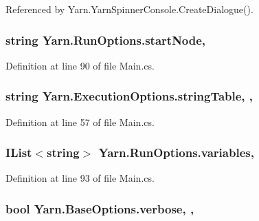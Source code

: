 Referenced by Yarn.\-Yarn\-Spinner\-Console.\-Create\-Dialogue().

\hypertarget{a00159_a785bd0f1c8b6674e7a1cfbe38c29b961}{
\subsubsection[{start\-Node}]{\setlength{\rightskip}{0pt plus 5cm}string Yarn.\-Run\-Options.\-start\-Node\hspace{0.3cm}{\ttfamily [get]}, {\ttfamily [set]}}}\label{a00159_a785bd0f1c8b6674e7a1cfbe38c29b961}


Definition at line 90 of file Main.\-cs.

\hypertarget{a00105_a7e43c3b73722956cb0f5d507e4eef527}{
\subsubsection[{string\-Table}]{\setlength{\rightskip}{0pt plus 5cm}string Yarn.\-Execution\-Options.\-string\-Table\hspace{0.3cm}{\ttfamily [get]}, {\ttfamily [set]}, {\ttfamily [inherited]}}}\label{a00105_a7e43c3b73722956cb0f5d507e4eef527}


Definition at line 57 of file Main.\-cs.

\hypertarget{a00159_a2222c73ce5366b02490c6123b711f596}{
\subsubsection[{variables}]{\setlength{\rightskip}{0pt plus 5cm}I\-List$<$string$>$ Yarn.\-Run\-Options.\-variables\hspace{0.3cm}{\ttfamily [get]}, {\ttfamily [set]}}}\label{a00159_a2222c73ce5366b02490c6123b711f596}


Definition at line 93 of file Main.\-cs.

\hypertarget{a00043_ada4d83d1756918f362d55f6649b82b17}{
\subsubsection[{verbose}]{\setlength{\rightskip}{0pt plus 5cm}bool Yarn.\-Base\-Options.\-verbose\hspace{0.3cm}{\ttfamily [get]}, {\ttfamily [set]}, {\ttfamily [inherited]}}}\label{a00043_ada4d83d1756918f362d55f6649b82b17}


